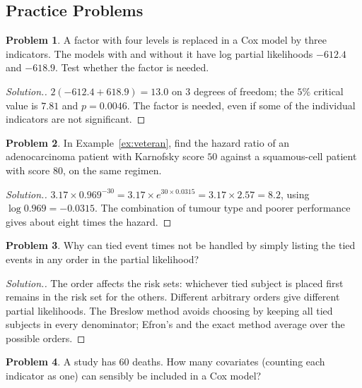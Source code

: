 \documentclass[11pt,a4paper]{article}
\numberwithin{equation}{section}
\theoremstyle{definition}
\newtheorem{problemx}{Problem}[subsection]
\newenvironment{problem}{\begin{problemx}}{\end{problemx}}
\newenvironment{solution}
  {\renewcommand{\qedsymbol}{}\begin{proof}[\textit{Solution}.]}
  {\end{proof}}
\begin{document}
\subsection{Practice Problems}

\begin{problem}
A factor with four levels is replaced in a Cox model by three indicators. The models with and without it have log partial likelihoods $-612.4$ and $-618.9$. Test whether the factor is needed.
\end{problem}

\begin{solution}
$2(-612.4 + 618.9) = 13.0$ on $3$ degrees of freedom; the $5\%$ critical value is $7.81$ and $p = 0.0046$. The factor is needed, even if some of the individual indicators are not significant.
\end{solution}

\begin{problem}
In Example~\ref{ex:veteran}, find the hazard ratio of an adenocarcinoma patient with Karnofsky score $50$ against a squamous-cell patient with score $80$, on the same regimen.
\end{problem}

\begin{solution}
$3.17 \times 0.969^{-30} = 3.17 \times e^{30 \times 0.0315} = 3.17 \times 2.57 = 8.2$, using $\log 0.969 = -0.0315$. The combination of tumour type and poorer performance gives about eight times the hazard.
\end{solution}

\begin{problem}
Why can tied event times not be handled by simply listing the tied events in any order in the partial likelihood?
\end{problem}

\begin{solution}
The order affects the risk sets: whichever tied subject is placed first remains in the risk set for the others. Different arbitrary orders give different partial likelihoods. The Breslow method avoids choosing by keeping all tied subjects in every denominator; Efron's and the exact method average over the possible orders.
\end{solution}

\begin{problem}
A study has $60$ deaths. How many covariates (counting each indicator as one) can sensibly be included in a Cox model?
\end{problem}
\end{document}
